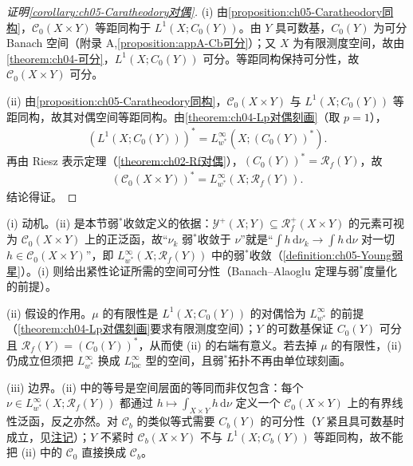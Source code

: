 \documentclass[../../main.tex]{subfiles}%
\begin{document}
\begin{proof}[证明\cref{corollary:ch05-Caratheodory对偶}]
(i) 由\cref{proposition:ch05-Caratheodory同构}，$\mathcal{C}_0(X\times Y)$ 等距同构于 $L^1(X;C_0(Y))$。由 $Y$ 具可数基，$C_0(Y)$ 为可分 Banach 空间（附录 A,\cref{proposition:appA-Cb可分}）；又 $X$ 为有限测度空间，故由\cref{theorem:ch04-可分}，$L^1(X;C_0(Y))$ 可分。等距同构保持可分性，故 $\mathcal{C}_0(X\times Y)$ 可分。

(ii) 由\cref{proposition:ch05-Caratheodory同构}，$\mathcal{C}_0(X\times Y)$ 与 $L^1(X;C_0(Y))$ 等距同构，故其对偶空间等距同构。由\cref{theorem:ch04-Lp对偶刻画}（取 $p=1$），
\begin{align*}
(L^1(X;C_0(Y)))^*=L^\infty_{w^*}(X;(C_0(Y))^*).
\end{align*}
再由 Riesz 表示定理（\cref{theorem:ch02-Rf对偶}），$(C_0(Y))^*=\mathscr{R}_f(Y)$，故
\begin{align*}
(\mathcal{C}_0(X\times Y))^*=L^\infty_{w^*}(X;\mathscr{R}_f(Y)).
\end{align*}
结论得证。
\end{proof}

\begin{remark}\label{remark:ch05-Caratheodory对偶动机}
(i) 动机。(ii) 是本节弱$^*$收敛定义的依据：$\mathcal{Y}^+(X;Y)\subseteq\mathscr{R}^+_f(X\times Y)$ 的元素可视为 $\mathcal{C}_0(X\times Y)$ 上的正泛函，故“$\nu_k$ 弱$^*$收敛于 $\nu$”就是“$\int h\,\mathrm{d}\nu_k\to\int h\,\mathrm{d}\nu$ 对一切 $h\in\mathcal{C}_0(X\times Y)$”，即 $L^\infty_{w^*}(X;\mathscr{R}_f(Y))$ 中的弱$^*$收敛（\cref{definition:ch05-Young弱星}）。(i) 则给出紧性论证所需的空间可分性（Banach--Alaoglu 定理与弱$^*$度量化的前提）。

(ii) 假设的作用。$\mu$ 的有限性是 $L^1(X;C_0(Y))$ 的对偶恰为 $L^\infty_{w^*}$ 的前提（\cref{theorem:ch04-Lp对偶刻画}要求有限测度空间）；$Y$ 的可数基保证 $C_0(Y)$ 可分且 $\mathscr{R}_f(Y)=(C_0(Y))^*$，从而使 (ii) 的右端有意义。若去掉 $\mu$ 的有限性，(ii) 仍成立但须把 $L^\infty_{w^*}$ 换成 $L^\infty_{\mathrm{loc}}$ 型的空间，且弱$^*$拓扑不再由单位球刻画。

(iii) 边界。(ii) 中的等号是空间层面的等同而非仅包含：每个 $\nu\in L^\infty_{w^*}(X;\mathscr{R}_f(Y))$ 都通过 $h\mapsto\int_{X\times Y}h\,\mathrm{d}\nu$ 定义一个 $\mathcal{C}_0(X\times Y)$ 上的有界线性泛函，反之亦然。对 $\mathcal{C}_b$ 的类似等式需要 $C_b(Y)$ 的可分性（$Y$ 紧且具可数基时成立，见\hyperref[remark:ch05-紧空间同构修正]{注记}）；$Y$ 不紧时 $\mathcal{C}_b(X\times Y)$ 不与 $L^1(X;C_b(Y))$ 等距同构，故不能把 (ii) 中的 $\mathcal{C}_0$ 直接换成 $\mathcal{C}_b$。
\end{remark}
\end{document}

